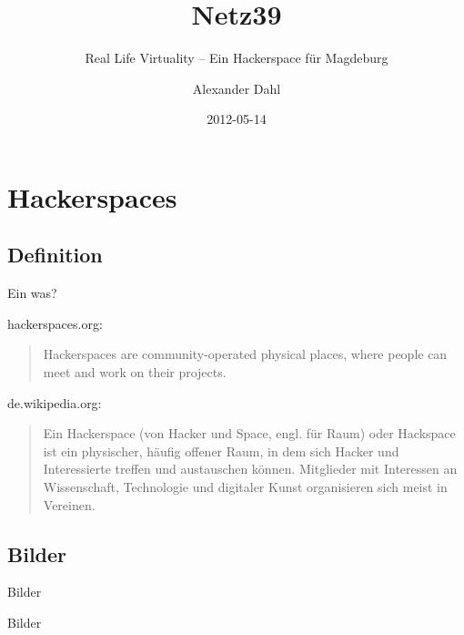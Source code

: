 \documentclass[hyperref={pdfpagelabels=false}]{beamer}
\title[Netz39]{Netz39}
\subtitle{Real Life Virtuality -- Ein Hackerspace für Magdeburg}
\author{Alexander Dahl}
\institute[netz39.de]{\url{http://www.netz39.de/}}
\date{2012-05-14}
\begin{document}
\begin{frame}
	\titlepage
\end{frame}


\section{Hackerspaces}

\subsection{Definition}

\begin{frame}{Ein was?}
    \begin{block}{hackerspaces.org:}
        \begin{quote}
            Hackerspaces are community-operated physical places, where people
            can meet and work on their projects.
        \end{quote}
    \end{block}
    \pause
    \begin{block}{de.wikipedia.org:}
        \begin{quote}
            Ein Hackerspace (von Hacker und Space, engl. für Raum) oder
            Hackspace ist ein physischer, häufig offener Raum, in dem sich
            Hacker und Interessierte treffen und austauschen können.
            Mitglieder mit Interessen an Wissenschaft, Technologie und
            digitaler Kunst organisieren sich meist in Vereinen.
        \end{quote}
    \end{block}
\end{frame}

\subsection{Bilder}

\begin{frame}[label=secbaellebad]{Bilder}
    \begin{figure}
    \end{figure}
\end{frame}

\begin{frame}[label=secddr]{Bilder}
    \begin{figure}
    \end{figure}
\end{frame}
\end{document}
